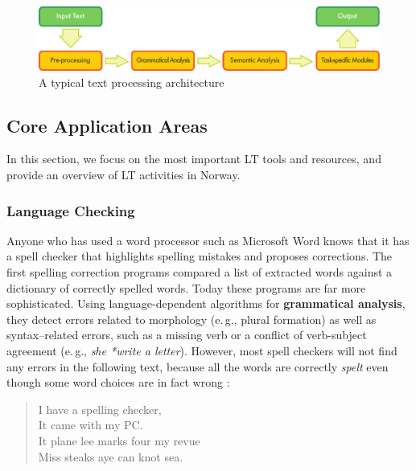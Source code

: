 \begin{multicols}{2}
\begin{figure}[htb]
  \center
  \includegraphics[width=\textwidth]{../_media/english/text_processing_app_architecture}
  \caption{A typical text processing architecture}
  \label{fig:textprocessingarch_en}
\end{figure}

\subsection{Core Application Areas}

In this section, we focus on the most important LT tools and resources, and provide an overview of LT activities in 
Norway. 

\subsubsection{Language Checking}

Anyone who has used a word processor such as Microsoft Word knows that it has a spell checker that highlights spelling mistakes and proposes corrections. The first spelling correction programs compared a list of extracted words against a dictionary of correctly spelled words. Today these programs are far more sophisticated. Using language-dependent algorithms for \textbf{grammatical analysis}, they detect errors related to morphology (e.\,g., plural formation) as well as syntax–related errors, such as a missing verb or a conflict of verb-subject agreement (e.\,g., \textit{she *write a letter}). However, most spell checkers will not find any errors in the following text, because all the words are correctly \textit{spelt} even though some word choices are in fact wrong \cite{zar1}:

\begin{quote}
  I have a spelling checker,\\
  It came with my PC.\\
  It plane lee marks four my revue\\
  Miss steaks aye can knot sea.
\end{quote}


\end{multicols}
